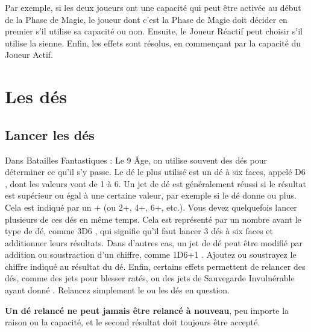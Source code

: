  Par exemple, si les deux joueurs ont une capacité qui peut être activée au début de la Phase de Magie, le joueur dont c'est la Phase de Magie doit décider en premier s'il utilise sa capacité ou non. Ensuite, le Joueur Réactif peut choisir s'il utilise la sienne. Enfin, les effets sont résolus, en commençant par la capacité du Joueur Actif.

\section{Les dés}

\subsection{Lancer les dés}

Dans Batailles Fantastiques : Le 9\ieme{} Âge, on utilise souvent des dés pour déterminer ce qu'il s'y passe. Le dé le plus utilisé est un dé à six faces, appelé \og D6 \fg{}, dont les valeurs vont de 1 à 6. Un jet de dé est généralement réussi si le résultat est supérieur ou égal à une certaine valeur, par exemple si le dé donne  ou plus. Cela est indiqué par un + \fg{} (ou 2+, 4+, 6+, etc.). Vous devez quelquefois lancer plusieurs de ces dés en même temps. Cela est représenté par un nombre avant le type de dé, comme \og 3D6 \fg{}, qui signifie qu'il faut lancer 3 dés à six faces et additionner leurs résultats. Dans d'autres cas, un jet de dé peut être modifié par addition ou soustraction d'un chiffre, comme \og 1D6+1 \fg{}. Ajoutez ou soustrayez le chiffre indiqué au résultat du dé. Enfin, certains effets permettent de relancer des dés, comme des jets pour blesser ratés, ou des jets de Sauvegarde Invulnérable ayant donné . Relancez simplement le ou les dés en question.

\textbf{Un dé relancé ne peut jamais être relancé à nouveau}, peu importe la raison ou la capacité, et le second résultat doit toujours être accepté.

